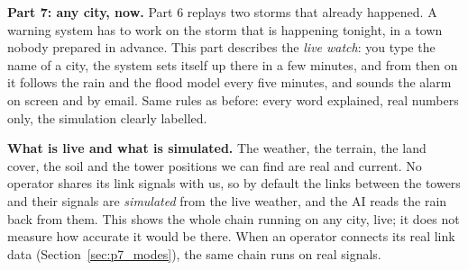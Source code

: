 \clearpage
\begin{center}
\begin{minipage}{0.86\textwidth}
\small
\textbf{Part 7: any city, now.} Part 6 replays two storms that already happened. A warning system has to work on the
storm that is happening tonight, in a town nobody prepared in advance. This part describes the \emph{live watch}: you
type the name of a city, the system sets itself up there in a few minutes, and from then on it follows the rain and
the flood model every five minutes, and sounds the alarm on screen and by email. Same rules as before: every word
explained, real numbers only, the simulation clearly labelled.
\end{minipage}
\end{center}

\begin{careful}
\textbf{What is live and what is simulated.} The weather, the terrain, the land cover, the soil and the tower positions
we can find are real and current. No operator shares its link signals with us, so by default the links between the
towers and their signals are \emph{simulated} from the live weather, and the AI reads the rain back from them. This shows
the whole chain running on any city, live; it does not measure how accurate it would be there. When an operator
connects its real link data (Section~\ref{sec:p7_modes}), the same chain runs on real signals.
\end{careful}

